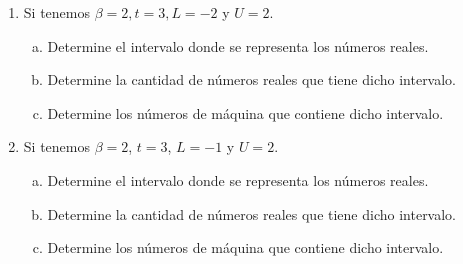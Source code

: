 \documentclass[
	spanish,
	9pt,
	utf8,
	xcolor=table,
	handout,
	aspectratio=1610,
	professionalfonts,
	notheorems,
	mathserif,
]{beamer}
\newcounter{savedenum}
\newcommand*{\saveenum}{\setcounter{savedenum}{\theenumi}}
\begin{document}
\begin{frame}
\begin{enumerate}
		\item
		      Si tenemos $\beta=2, t=3, L=-2$ y $U=2$.
		      \begin{enumerate}[a)]
			      \item
			            Determine el intervalo donde se representa los números reales.

			      \item
			            Determine la cantidad de números reales que tiene dicho intervalo.

			      \item
			            Determine los números de máquina que contiene dicho intervalo.
		      \end{enumerate}

		\item
		      Si tenemos $\beta=2$, $t=3$, $L=-1$ y $U=2$.
		      \begin{enumerate}[a)]
			      \item
			            Determine el intervalo donde se representa los números reales.

			      \item
			            Determine la cantidad de números reales que tiene dicho intervalo.

			      \item
			            Determine los números de máquina que contiene dicho intervalo.
		      \end{enumerate}

		      \saveenum
	\end{enumerate}
\end{frame}
\end{document}
